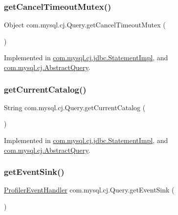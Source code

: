 \subsubsection{\texorpdfstring{get\+Cancel\+Timeout\+Mutex()}{getCancelTimeoutMutex()}}
{\footnotesize\ttfamily Object com.\+mysql.\+cj.\+Query.\+get\+Cancel\+Timeout\+Mutex (\begin{DoxyParamCaption}{ }\end{DoxyParamCaption})}



Implemented in \mbox{\hyperlink{classcom_1_1mysql_1_1cj_1_1jdbc_1_1_statement_impl_a428c7f909851189bed9fdc590ee2e770}{com.\+mysql.\+cj.\+jdbc.\+Statement\+Impl}}, and \mbox{\hyperlink{classcom_1_1mysql_1_1cj_1_1_abstract_query_a1159763749875aa297941f344d9cc542}{com.\+mysql.\+cj.\+Abstract\+Query}}.

\mbox{\label{interfacecom_1_1mysql_1_1cj_1_1_query_a5e5e4f493fd7d0ea5e0ac6d2066af251}} 
\subsubsection{\texorpdfstring{get\+Current\+Catalog()}{getCurrentCatalog()}}
{\footnotesize\ttfamily String com.\+mysql.\+cj.\+Query.\+get\+Current\+Catalog (\begin{DoxyParamCaption}{ }\end{DoxyParamCaption})}



Implemented in \mbox{\hyperlink{classcom_1_1mysql_1_1cj_1_1jdbc_1_1_statement_impl_af2b2cc49667c4ca719920667ed148629}{com.\+mysql.\+cj.\+jdbc.\+Statement\+Impl}}, and \mbox{\hyperlink{classcom_1_1mysql_1_1cj_1_1_abstract_query_a77d27488fdee8947c779e97796b433c3}{com.\+mysql.\+cj.\+Abstract\+Query}}.

\mbox{\label{interfacecom_1_1mysql_1_1cj_1_1_query_a3e23446737570171c4323243ce3f9239}} 
\subsubsection{\texorpdfstring{get\+Event\+Sink()}{getEventSink()}}
{\footnotesize\ttfamily \mbox{\hyperlink{interfacecom_1_1mysql_1_1cj_1_1log_1_1_profiler_event_handler}{Profiler\+Event\+Handler}} com.\+mysql.\+cj.\+Query.\+get\+Event\+Sink (\begin{DoxyParamCaption}{ }\end{DoxyParamCaption})}




